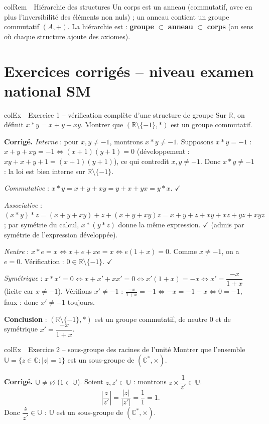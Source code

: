 \documentclass[11pt,a4paper]{article}
\newenvironment{exemple}[1][Exemple]
  {\begin{fiche}{colEx}{\ding{217}~~#1}}{\end{fiche}}
\newenvironment{remarque}[1][Remarque]
  {\begin{fiche}{colRem}{\ding{43}~~#1}}{\end{fiche}}
\begin{document}
\begin{remarque}[Hiérarchie des structures]
Un corps est un anneau (commutatif, avec en plus l'inversibilité des éléments non nuls) ; un anneau contient un groupe commutatif $(A,+)$. La hiérarchie est : \textbf{groupe} $\subset$ \textbf{anneau} $\subset$ \textbf{corps} (au sens où chaque structure ajoute des axiomes).
\end{remarque}

\section{Exercices corrigés -- niveau examen national SM}

\begin{exemple}[Exercice 1 -- vérification complète d'une structure de groupe]
Sur $\mathbb{R}$, on définit $x*y=x+y+xy$. Montrer que $(\mathbb{R}\setminus\{-1\},*)$ est un groupe commutatif.

\smallskip
\textbf{Corrigé.} \emph{Interne} : pour $x,y\ne-1$, montrons $x*y\ne-1$. Supposons $x*y=-1$ : $x+y+xy=-1\iff(x+1)(y+1)=0$ (développement : $xy+x+y+1=(x+1)(y+1)$), ce qui contredit $x,y\ne-1$. Donc $x*y\ne-1$ : la loi est bien interne sur $\mathbb{R}\setminus\{-1\}$.

\smallskip
\emph{Commutative} : $x*y=x+y+xy=y+x+yx=y*x$. $\checkmark$

\smallskip
\emph{Associative} : $(x*y)*z=(x+y+xy)+z+(x+y+xy)z=x+y+z+xy+xz+yz+xyz$ ; par symétrie du calcul, $x*(y*z)$ donne la même expression. $\checkmark$ (admis par symétrie de l'expression développée).

\smallskip
\emph{Neutre} : $x*e=x\iff x+e+xe=x\iff e(1+x)=0$. Comme $x\ne-1$, on a $e=0$. Vérification : $0\in\mathbb{R}\setminus\{-1\}$. $\checkmark$

\smallskip
\emph{Symétrique} : $x*x'=0\iff x+x'+xx'=0\iff x'(1+x)=-x\iff x'=\dfrac{-x}{1+x}$ (licite car $x\ne-1$). Vérifions $x'\ne-1$ : $\frac{-x}{1+x}=-1\iff-x=-1-x\iff0=-1$, faux : donc $x'\ne-1$ toujours.

\smallskip
\textbf{Conclusion} : $(\mathbb{R}\setminus\{-1\},*)$ est un groupe commutatif, de neutre $0$ et de symétrique $x'=\dfrac{-x}{1+x}$.
\end{exemple}

\begin{exemple}[Exercice 2 -- sous-groupe des racines de l'unité]
Montrer que l'ensemble $\mathbb{U}=\{z\in\mathbb{C} : |z|=1\}$ est un sous-groupe de $(\mathbb{C}^*,\times)$.

\smallskip
\textbf{Corrigé.} $\mathbb{U}\ne\varnothing$ ($1\in\mathbb{U}$). Soient $z,z'\in\mathbb{U}$ : montrons $z\times\dfrac1{z'}\in\mathbb{U}$.
\[
  \left|\frac{z}{z'}\right| = \frac{|z|}{|z'|} = \frac11 = 1.
\]
Donc $\dfrac{z}{z'}\in\mathbb{U}$ : $\mathbb{U}$ est un sous-groupe de $(\mathbb{C}^*,\times)$.
\end{exemple}
\end{document}
